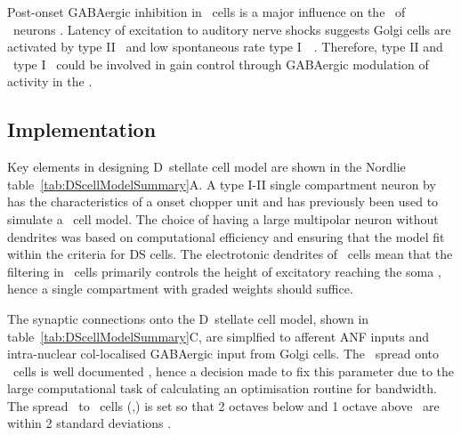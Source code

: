 
Post-onset GABAergic inhibition in \DS~cells is a major influence on the
\PSTH~of \OnC~neurons \citep{FerragamoGoldingEtAl:1998a,EvansZhao:1998}. Latency
of excitation to auditory nerve shocks suggests Golgi cells are activated by
type II \ANFs~and low spontaneous rate type I~\ANFs~\citep{BensonBerglundEtAl:1996, FerragamoGoldingEtAl:1998}. Therefore,
type II and \LSR~type I \ANFs~could be involved in gain control through
GABAergic modulation of activity in the \VCN\@.






\subsection{Implementation    \label{sec:DS:implementation}}
 

Key elements in designing D~stellate cell model are shown in the Nordlie
table~\ref{tab:DScellModelSummary}A. A type I-II single compartment neuron
by \citet{RothmanManis:2003b} has the characteristics of a onset chopper
unit and has previously been used to simulate a \DS~cell model. The choice
of having a large multipolar neuron without dendrites was based on
computational efficiency and ensuring that the model fit within the
criteria for DS cells. The electrotonic dendrites of \DS~cells mean that
the filtering in \DS~cells primarily controls the height of excitatory
{\PSPs} reaching the soma \citep{WhiteYoungEtAl:1994}, hence a single
compartment with graded weights should suffice. 


The synaptic connections onto the
D~stellate cell model, shown in table~\ref{tab:DScellModelSummary}C, are
simplfied to afferent ANF inputs and intra-nuclear col-localised GABAergic input
from Golgi cells. The \ANF~spread onto \DS~cells is well documented
\citep{PaoliniClark:1999,ArnottWallaceEtAl:2004,PalmerWallaceEtAl:2003,JiangPalmerEtAl:1996,PalmerJiangEtAl:1996},
hence a decision made to fix this parameter due to the large computational task
of calculating an optimisation routine for \ANFDS bandwidth.  The spread \ANF~to
\DS~cells (\sANFDSh,\sANFDSl) is set so that 2 octaves below and 1 octave above
\CF~are within 2 standard deviations \citep{PaoliniClark:1999}.

